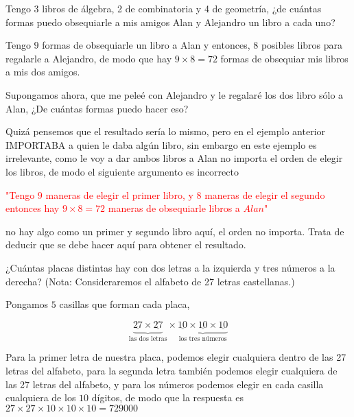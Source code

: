 \documentclass[11pt]{scrartcl}
\begin{document}
\begin{example}
    Tengo 3 libros de álgebra, 2 de combinatoria y 4 de geometría, ¿de cuántas formas puedo obsequiarle a mis amigos Alan y Alejandro un libro a cada uno?
\end{example}
\begin{flushleft}
Tengo $9$ formas de obsequiarle un libro a Alan y entonces, $8$ posibles libros para regalarle a Alejandro, de modo que hay $9\times 8=72$ formas de obsequiar mis libros a mis dos amigos.


\begin{example}
    
Supongamos ahora, que me peleé con Alejandro y le regalaré los dos libro sólo a Alan, ¿De cuántas formas puedo hacer eso?
\end{example}
Quizá pensemos que el resultado sería lo mismo, pero en el ejemplo anterior IMPORTABA a quien le daba algún libro, sin embargo en este ejemplo es irrelevante, como le voy a dar ambos libros a Alan no importa el orden de elegir los libros, de modo el siguiente argumento es incorrecto

\begin{center}
    \textcolor{red}{"Tengo $9$ maneras de elegir el primer libro, y $8$ maneras de elegir el segundo entonces hay $9\times 8=72$ maneras de obsequiarle libros a $\textit{Alan}$"}
\end{center}

no hay algo como un primer y segundo libro aquí, el orden no importa. Trata de deducir que se debe hacer aquí para obtener el resultado.

\end{flushleft}

\begin{example}
    ¿Cuántas placas distintas hay con dos letras a
    la izquierda y tres números a la derecha? (Nota: Consideraremos el
    alfabeto de 27 letras castellanas.)
\end{example}

\begin{flushleft}
Pongamos $5$ casillas que forman cada placa, 
\end{flushleft}
\[\underbrace{\underline{27}\times\underline{27}}_{\text{las dos letras}}\times\underbrace{\underline{10}\times \underline{10} \times \underline{10}}_{\text{los tres números}}\]
\vspace*{0.5cm}
\begin{flushleft}
Para la primer letra de nuestra placa, podemos elegir cualquiera dentro de las 27 letras del alfabeto, para la segunda letra también podemos elegir cualquiera de las 27 letras del alfabeto, y para los números podemos elegir en cada casilla cualquiera de los $10$  dígitos, de modo que la respuesta es $\boxed{27\times 27\times 10\times 10\times 10=729000}$
\end{flushleft}
\end{document}
